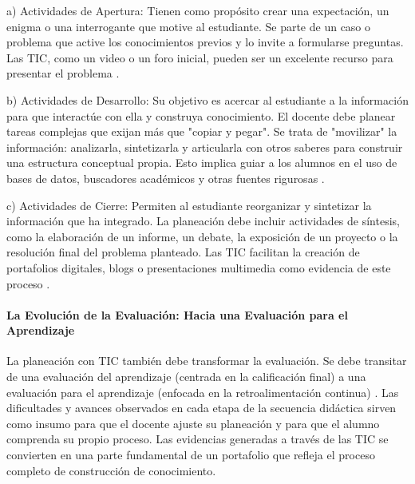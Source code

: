 a) Actividades de Apertura: Tienen como propósito crear una expectación, un enigma o una interrogante que motive al estudiante. Se parte de un caso o problema que active los conocimientos previos y lo invite a formularse preguntas. Las TIC, como un video o un foro inicial, pueden ser un excelente recurso para presentar el problema \cite{diazangel2013}.

b) Actividades de Desarrollo: Su objetivo es acercar al estudiante a la información para que interactúe con ella y construya conocimiento. El docente debe planear tareas complejas que exijan más que "copiar y pegar". Se trata de "movilizar" la información: analizarla, sintetizarla y articularla con otros saberes para construir una estructura conceptual propia. Esto implica guiar a los alumnos en el uso de bases de datos, buscadores académicos y otras fuentes rigurosas \cite{diazangel2013}.

c) Actividades de Cierre: Permiten al estudiante reorganizar y sintetizar la información que ha integrado. La planeación debe incluir actividades de síntesis, como la elaboración de un informe, un debate, la exposición de un proyecto o la resolución final del problema planteado. Las TIC facilitan la creación de portafolios digitales, blogs o presentaciones multimedia como evidencia de este proceso \cite{diazangel2013}.

\paragraph{La Evolución de la Evaluación: Hacia una Evaluación para el Aprendizaje}

La planeación con TIC también debe transformar la evaluación. Se debe transitar de una evaluación del aprendizaje (centrada en la calificación final) a una evaluación para el aprendizaje (enfocada en la retroalimentación continua) \textcite{diazangel2013}. Las dificultades y avances observados en cada etapa de la secuencia didáctica sirven como insumo para que el docente ajuste su planeación y para que el alumno comprenda su propio proceso. Las evidencias generadas a través de las TIC se convierten en una parte fundamental de un portafolio que refleja el proceso completo de construcción de conocimiento.


